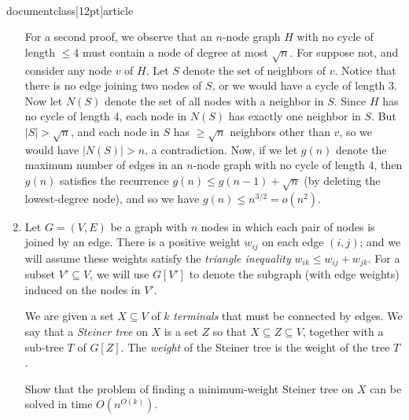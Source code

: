 \\documentclass[12pt]{article}
\begin{document}
\begin{enumerate}
{For a second proof, 
we observe that an $n$-node graph $H$ with no cycle
of length $\leq 4$ must contain a node of degree at most $\sqrt{n}$.
For suppose not, and consider any node $v$ of $H$.
Let $S$ denote the set of neighbors of $v$.
Notice that there is no edge joining two nodes of $S$,
or we would have a cycle of length $3$.
Now let $N(S)$ denote the set of all nodes with a neighbor in $S$.
Since $H$ has no cycle of length $4$,
each node in $N(S)$ has exactly one neighbor in $S$.
But $|S| > \sqrt{n}$, and each node in $S$ has $\geq \sqrt{n}$
neighbors other than $v$, so we would have
$|N(S)| > n$, a contradiction.
Now, if we let $g(n)$ denote the maximum number
of edges in an $n$-node graph with no cycle of length $4$,
then $g(n)$ satisfies the recurrence
$g(n) \leq g(n-1) + \sqrt{n}$ (by deleting the lowest-degree node),
and so we have
$g(n) \leq n^{3/2} = o(n^2)$.
 
}








\item 

Let $G = (V,E)$ be a graph
with $n$ nodes in which
each pair of nodes is joined by an edge.
There is a positive weight $w_{ij}$ on each edge $(i,j)$;
and we will assume these weights satisfy the
{\em triangle inequality}
$w_{ik} \leq w_{ij} + w_{jk}.$
For a subset $V' \subseteq V$, we will use $G[V']$
to denote the subgraph (with edge weights) induced on
the nodes in $V'$.

We are given a set $X \subseteq V$ of $k$ {\em terminals}
that must be connected by edges.
We say that a {\em Steiner tree} on $X$ is a set
$Z$ so that $X \subseteq Z \subseteq V$,
together with a sub-tree $T$ of $G[Z]$.
The {\em weight} of the Steiner tree is the weight of the tree $T$.

Show that the problem of finding a minimum-weight
Steiner tree on $X$ can be solved in time $O(n^{O(k)})$.

\end{enumerate}
\end{document}
